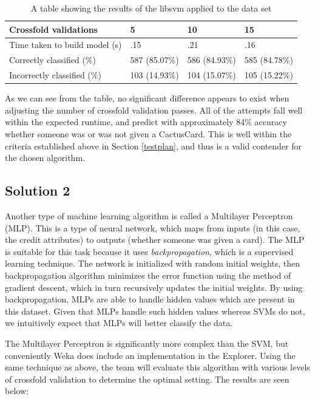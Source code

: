 \documentclass[11pt,journal]{IEEEtran}
\begin{document}
\begin{table}[H]
{\renewcommand{\arraystretch}{1.2}%
\begin{tabular}{ | p{2.5cm} | l | l | l | }
\hline
Crossfold validations         & 5             & 10            & 15            \\ \hline
Time taken to build model (s) & .15           & .21           & .16           \\ \hline
Correctly classified (\%)     & 587 (85.07\%) & 586 (84.93\%) & 585 (84.78\%) \\ \hline
Incorrectly classified (\%)   & 103 (14.93\%) & 104 (15.07\%) & 105 (15.22\%) \\ \hline
\end{tabular}} \quad
\caption{A table showing the results of the libsvm applied to the data set}
\end{table}

As we can see from the table, no significant difference appears to exist when adjusting the number of crossfold validation passes. All of the attempts fall well within the expected runtime, and predict with approximately 84\% accuracy whether someone was or was not given a CactusCard. This is well within the criteria established above in Section \ref{testplan}, and thus is a valid contender for the chosen algorithm.

\subsection{Solution 2}
Another type of machine learning algorithm is called a Multilayer Perceptron (MLP). This is a type of neural network, which maps from inputs (in this case, the credit attributes) to outputs (whether someone was given a card). The MLP is suitable for this task because it uses \emph{backpropagation}, which is a supervised learning technique. The network is initialized with random initial weights, then backpropagation algorithm minimizes the error function using the method of gradient descent, which in turn recursively updates the initial weights. By using backpropagation, MLPs are able to handle hidden values which are present in this dataset. Given that MLPs handle such hidden values whereas SVMs do not, we intuitively expect that MLPs will better classify the data.
\par
The Multilayer Perceptron is significantly more complex than the SVM, but conveniently Weka does include an implementation in the Explorer. Using the same technique as above, the team will evaluate this algorithm with various levels of crossfold validation to determine the optimal setting. The results are seen below:
\end{document}
